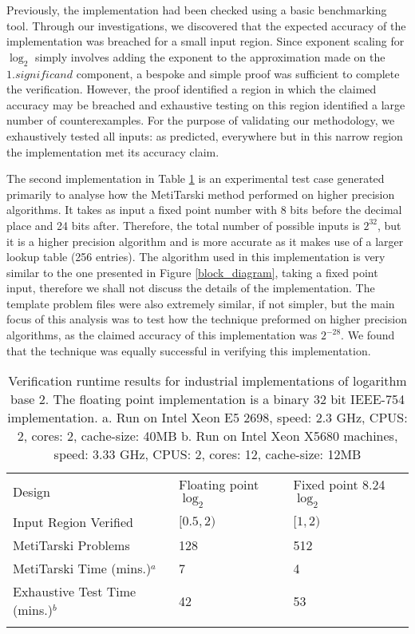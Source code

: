 \documentclass{fac}
\begin{document}
Previously, the implementation had been checked using a basic benchmarking tool. Through our investigations, we discovered that the expected accuracy of the implementation was breached for a small input region. Since exponent scaling for $\log_2$ simply involves adding the exponent to the approximation made on the $1.\textit{significand}$ component, a bespoke and simple proof was sufficient to complete the verification. However, the proof identified a region in which the claimed accuracy may be breached and exhaustive testing on this region identified a large number of counterexamples. For the purpose of validating our methodology, we exhaustively tested all inputs: as predicted, everywhere but in this narrow region the implementation met its accuracy claim.

The second implementation in Table \ref{result} is an experimental test case generated primarily to analyse how the MetiTarski method performed on higher precision algorithms. It takes as input a fixed point number with 8 bits before the decimal place and 24 bits after. Therefore, the total number of possible inputs is $2^{32}$, but it is a higher precision algorithm and is more accurate as it makes use of a larger lookup table (256 entries). The algorithm used in this implementation is very similar to the one presented in Figure \ref{block_diagram}, taking a fixed point input, therefore we shall not discuss the details of the implementation. The template problem files were also extremely similar, if not simpler, but the main focus of this analysis was to test how the technique preformed on higher precision algorithms, as the claimed accuracy of this implementation was $2^{-28}$. We found that the technique was equally successful in verifying this implementation. 

\begin{table}
\begin{tabular}{lll}
\hline\noalign{\smallskip}
Design & Floating point $\log_2$ & Fixed point 8.24 $\log_2$    \\

\noalign{\smallskip}\hline\noalign{\smallskip}

 Input Region Verified& $[0.5,2)$ & $[1,2) $ \\ 
 MetiTarski Problems & 128 & 512 \\
 MetiTarski Time (mins.)$^a$ &  7 & 4 \\ 
 Exhaustive Test Time (mins.)$^b$ & 42 & 53 \\
\noalign{\smallskip}\hline
\end{tabular}
\caption{Verification runtime results for industrial implementations of logarithm base 2. The floating point implementation is a binary 32 bit IEEE-754 implementation.\newline
a. Run on Intel Xeon E5 2698, speed: 2.3 GHz, CPUS: 2, cores: 2, cache-size: 40MB
\newline
b. Run on Intel Xeon X5680 machines, speed: 3.33 GHz, CPUS: 2, cores: 12, cache-size: 12MB}\label{result}     
\end{table}
\end{document}
